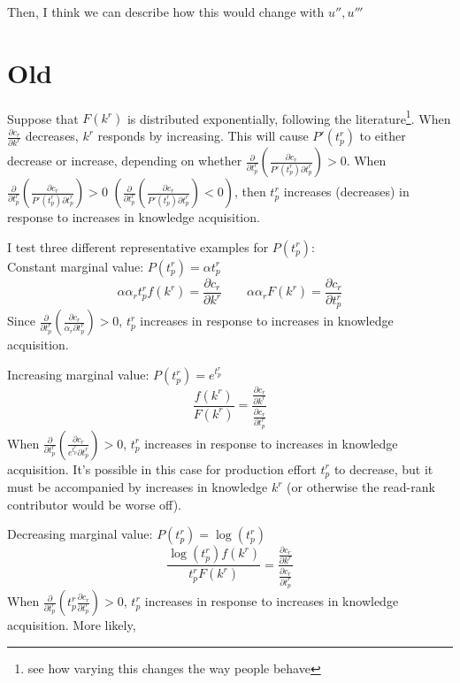 \documentclass[source/paper/main.tex]{subfiles}
\begin{document}
Then, I think we can describe how this would change with $u'', u'''$

\section{Old}

Suppose that $F(k^r)$ is distributed exponentially, following the literature\footnote{see how varying this changes the way people behave}. When $\frac{\partial c_r}{\partial k^r}$ decreases,  $k^r$ responds by increasing. This will cause $P'(t_p^r)$ to either decrease or increase, depending on whether $\frac{\partial }{\partial t_p^r}(\frac{\partial c_r}{P'(t_p^r)\partial t_p^r})>0$. When $\frac{\partial }{\partial t_p^r}(\frac{\partial c_r}{P'(t_p^r)\partial t_p^r})>0$ $(\frac{\partial }{\partial t_p^r}(\frac{\partial c_r}{P'(t_p^r)\partial t_p^r})<0)$, then $t_p^r$ increases (decreases) in response to increases in knowledge acquisition. 


I test three different representative examples for $P(t_p^r)$:\\
Constant marginal value: $P(t_p^r) = \alpha t_p^r$
$$\alpha \alpha_r  t_p^r f(k^r)= \frac{\partial c_r}{\partial k^r} \qquad \alpha \alpha_r F(k^r) = \frac{\partial c_r}{\partial t_p^r}$$
Since $\frac{\partial }{\partial t_p^r}(\frac{\partial c_r}{\alpha_r \partial t_p^r})>0$, $t_p^r$ increases in response to increases in knowledge acquisition. 
 
 Increasing marginal value: $P(t_p^r) = e^{t_p^r}$
$$\frac{f(k^r)}{F(k^r)} = \frac{\frac{\partial c_r}{\partial k^r}}{\frac{\partial c_r}{\partial t_p^r}}$$
When $\frac{\partial }{\partial t_p^r}(\frac{\partial c_r}{e^{t_p^r} \partial t_p^r})>0$, $t_p^r$ increases in response to increases in knowledge acquisition. It's possible in this case for production effort $t_p^r$ to decrease, but it must be accompanied by increases in knowledge $k^r$ (or otherwise the read-rank contributor would be worse off). 

Decreasing marginal value: $P(t_p^r) = \log(t_p^r)$
$$\frac{\log(t_p^r)f(k^r)}{t_p^rF(k^r)} = \frac{\frac{\partial c_r}{\partial k^r}}{\frac{\partial c_r}{\partial t_p^r}}$$
When $\frac{\partial }{\partial t_p^r}(t_p^r \frac{\partial c_r}{\partial t_p^r})>0$, $t_p^r$ increases in response to increases in knowledge acquisition. More likely, \\
\end{document}
